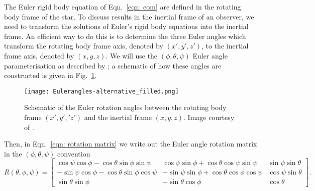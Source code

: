 \documentclass[../full_thesis/full_thesis.tex]{subfiles}
\begin{document}
The Euler rigid body equation of Eqn.~\eqref{eqn: eom} are defined in the
rotating body frame of the star. To discuss results in the inertial frame of an
observer, we need to transform the solutions of Euler's rigid body equations
into the inertial frame.  An efficient way to do this is to determine the three
Euler angles which transform the rotating body frame axis, denoted by $(x',y',
z')$, to the inertial frame axis, denoted by $(x, y, z)$. We will use the
$(\phi, \theta, \psi)$ Euler
angle parameterisation as described by \citet{Landau1969}; a schematic of how
these angles are constructed is given in Fig.~\ref{fig: Euler}.
\begin{figure}[ht]
\centering
\texttt{[image: Eulerangles-alternative\_filled.png]}
\caption{Schematic of the Euler rotation angles between the rotating body
frame $(x', y', 'z')$ and the inertial frame $(x, y, z)$. Image courtesy of
 \citet{WikipediaEuler}.}
\label{fig: Euler}
\end{figure}
Then, in Eqn.~\eqref{eqn: rotation matrix} we write out the Euler angle
rotation matrix in the $(\phi, \theta, \psi)$ convention
\begin{equation}
R(\theta, \phi, \psi) = \left[
\begin{array}{ccc}
\cos\psi \cos\phi - \cos\theta \sin\phi \sin \psi &
\cos\psi \sin \phi + \cos\theta \cos \psi \sin \psi &
\sin \psi \sin\theta \\
-\sin\psi \cos\phi - \cos\theta\sin\phi\cos\psi &
-\sin\psi\sin\phi + \cos\theta\cos\phi\cos\psi &
\cos\psi \sin\theta \\
\sin\theta\sin\phi &
-\sin\theta \cos\phi &
\cos\theta
\end{array}
\right].
\label{eqn: rotation matrix}
\end{equation}
\end{document}
